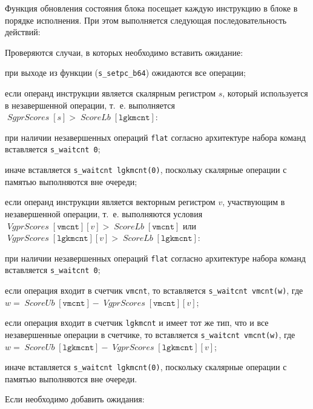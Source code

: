 \documentclass[a4paper,14pt]{extarticle}
\newcommand{\var}[1]{\mathop{\mathit{#1}}}
\begin{document}
{Функция обновления состояния блока посещает каждую инструкцию в блоке в порядке
исполнения. При этом выполняется следующая последовательность действий:
\begin{ol}
\item Проверяются случаи, в которых необходимо вставить ожидание:
  \begin{ol}
  \item при выходе из функции (\verb|s_setpc_b64|) ожидаются все операции;
  \item если операнд инструкции является скалярным регистром $s$, который используется в
    незавершенной операции, т.~е. выполняется $\var{SgprScores}[s] > \var{ScoreLb}[\mathtt{lgkmcnt}]$:
    \begin{ul}
    \item при наличии незавершенных операций \verb|flat| согласно архитектуре набора
      команд~\cite[глава~9.2.2]{vega-isa} вставляется \verb|s_waitcnt 0|;
    \item иначе вставляется \verb|s_waitcnt lgkmcnt(0)|, поскольку скалярные операции с памятью
      выполняются вне очереди;
    \end{ul}
  \item если операнд инструкции является векторным регистром $v$, участвующим
    в незавершенной операции, т.~е. выполняются условия 
    $\var{VgprScores}[\mathtt{vmcnt}][v]>\var{ScoreLb}[\mathtt{vmcnt}]$ или
    $\var{VgprScores}[\mathtt{lgkmcnt}][v]>\var{ScoreLb}[\mathtt{lgkmcnt}]$:
    \begin{ul}
    \item при наличии незавершенных операций \verb|flat| согласно архитектуре набора
      команд вставляется \verb|s_waitcnt 0|;
    \item если операция входит в счетчик \verb|vmcnt|, то вставляется \verb|s_waitcnt vmcnt(w)|,
      где $w = \var{ScoreUb}[\mathtt{vmcnt}] - \var{VgprScores}[\mathtt{vmcnt}][v]$;
    \item если операция входит в счетчик \verb|lgkmcnt| и имеет тот же тип, что и все
      незавершенные операции в счетчике, то вставляется \verb|s_waitcnt vmcnt(w)|,
      где $w = \var{ScoreUb}[\mathtt{lgkmcnt}] - \var{VgprScores}[\mathtt{lgkmcnt}][v]$;
    \item иначе вставляется \verb|s_waitcnt lgkmcnt(0)|, поскольку скалярные операции с памятью
      выполняются вне очереди.
    \end{ul}
  \end{ol}
\item Если необходимо добавить ожидания:

\end{ol}}
\end{document}
